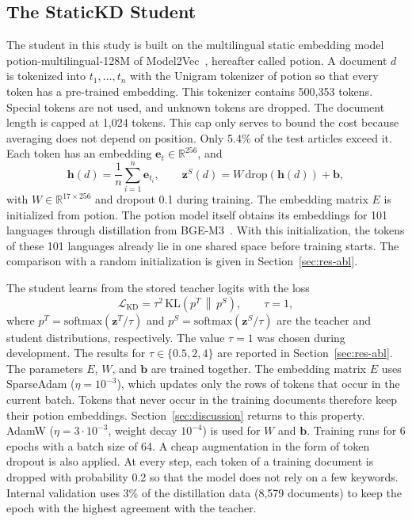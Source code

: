 \documentclass[journal]{IEEEtran}
\begin{document}
\subsection{The StaticKD Student}
\label{sec:student}
The student in this study is built on the multilingual static embedding model potion-multilingual-128M of Model2Vec~\cite{tulkens2024model2vec}, hereafter called potion. A document $d$ is tokenized into $t_1,\dots,t_n$ with the Unigram tokenizer of potion so that every token has a pre-trained embedding. This tokenizer contains 500,353 tokens. Special tokens are not used, and unknown tokens are dropped. The document length is capped at 1,024 tokens. This cap only serves to bound the cost because averaging does not depend on position. Only 5.4\% of the test articles exceed it. Each token has an embedding $\mathbf{e}_t\in\mathbb{R}^{256}$, and
\begin{equation}
\mathbf{h}(d)=\frac{1}{n}\sum_{i=1}^{n}\mathbf{e}_{t_i},\qquad
\mathbf{z}^{S}(d)=W\,\mathrm{drop}(\mathbf{h}(d))+\mathbf{b},
\label{eq:student}
\end{equation}
with $W\in\mathbb{R}^{17\times 256}$ and dropout 0.1 during training. The embedding matrix $E$ is initialized from potion. The potion model itself obtains its embeddings for 101 languages through distillation from BGE-M3~\cite{chen2024bgem3}. With this initialization, the tokens of these 101 languages already lie in one shared space before training starts. The comparison with a random initialization is given in Section~\ref{sec:res-abl}.

The student learns from the stored teacher logits with the loss
\begin{equation}
\mathcal{L}_{\mathrm{KD}}=\tau^{2}\,\mathrm{KL}\!\left(p^{T}\,\middle\|\,p^{S}\right),\qquad \tau=1 ,
\label{eq:kd}
\end{equation}
where $p^{T}=\mathrm{softmax}(\mathbf{z}^{T}/\tau)$ and $p^{S}=\mathrm{softmax}(\mathbf{z}^{S}/\tau)$ are the teacher and student distributions, respectively. The value $\tau=1$ was chosen during development. The results for $\tau\in\{0.5,2,4\}$ are reported in Section~\ref{sec:res-abl}. The parameters $E$, $W$, and $\mathbf{b}$ are trained together. The embedding matrix $E$ uses SparseAdam ($\eta=10^{-3}$), which updates only the rows of tokens that occur in the current batch. Tokens that never occur in the training documents therefore keep their potion embeddings. Section~\ref{sec:discussion} returns to this property. AdamW ($\eta=3\cdot 10^{-3}$, weight decay $10^{-4}$) is used for $W$ and $\mathbf{b}$. Training runs for 6 epochs with a batch size of 64. A cheap augmentation in the form of token dropout is also applied. At every step, each token of a training document is dropped with probability 0.2 so that the model does not rely on a few keywords. Internal validation uses 3\% of the distillation data (8,579 documents) to keep the epoch with the highest agreement with the teacher.
\end{document}
